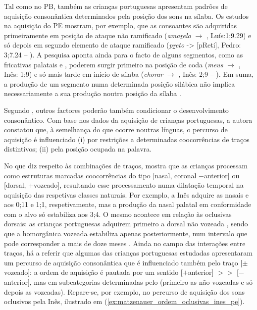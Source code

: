 \documentclass[output=paper]{LSP/langsci}
\begin{document}
Tal como no PB, também as crianças portuguesas apresentam padrões de aquisição consonântica determinados pela posição dos sons na sílaba. Os estudos na aquisição do PE mostram, por exemplo, que as consoantes são adquiridas primeiramente em posição de ataque não ramificado (\textit{ama\underline{r}elo} $\rightarrow$ , Luís:1;9.29) e só depois em segundo elemento de
ataque ramificado (\textit{p\underline{r}eto} -> [\textprimstress pReti], Pedro: 3;7.24 -- \citealt{freitassantos2001}). A pesquisa aponta ainda para o facto de alguns segmentos, como as fricativas palatais \textipa{[S]} e \textipa{[Z]}, poderem surgir primeiro na posição de coda (\textit{meus} $\rightarrow$ , Inês: 1;9) e só mais tarde em início de
sílaba (\textit{chorar} $\rightarrow$ , Inês: 2;9 – \citealt{almeida_etal2010}). Em suma, a produção de um
segmento numa determinada posição silábica não implica necessariamente a sua produção noutra posição da sílaba \citep{freitas1997,freitas2017}.

Segundo \citep{costa2010}, outros factores poderão também condicionar o desenvolvimento consonântico. Com base nos dados da aquisição de crianças portuguesas, a autora constatou que, à semelhança do que ocorre noutras línguas, o percurso de aquisição é influenciado (i) por restrições a determinadas coocorrências de traços distintivos; (ii) pela posição ocupada na palavra. 

No que diz respeito às combinações de traços, \citet{costa2010} mostra que as crianças processam como estruturas marcadas coocorrências do tipo [nasal, coronal $-$anterior] ou [dorsal, $+$vozeado], resultando esse processamento numa dilatação temporal na aquisição das respetivas classes naturais. Por exemplo, a Inês adquire as nasais  e  aos 0;11 e 1;1, respetivamente, mas a produção da nasal palatal em conformidade com o alvo só estabiliza aos 3;4. O mesmo acontece em relação às oclusivas dorsais: as crianças portuguesas adquirem primeiro a dorsal não vozeada , sendo que a homorgânica vozeada  estabiliza apenas posteriormente, num intervalo que pode corresponder a mais de doze meses \citep{costa2010}. Ainda no campo das interações entre traços, há a referir que algumas das crianças portuguesas estudadas apresentaram um percurso de aquisição consonântica que é influenciado também pelo traço [$\pm$vozeado]: a ordem de aquisição é pautada por um sentido [$+$anterior] $>>$ [$-$anterior], mas em subcategorias determinadas pelo  (primeiro as não vozeadas e só depois as vozeadas). Repare-se, por exemplo, no percurso de aquisição dos sons oclusivos pela Inês, ilustrado em (\ref{ex:matzenauer_ordem_oclusivas_ines_pe}).
\end{document}
